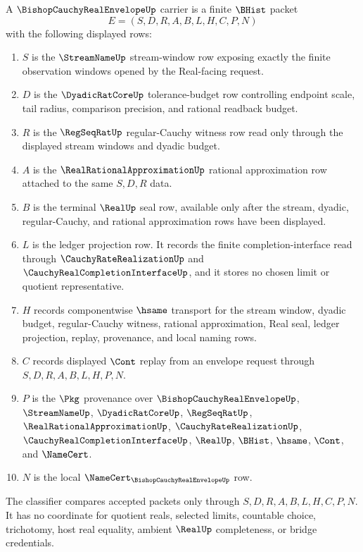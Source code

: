 \begin{definition}
\label{def:bishop-cauchy-real-envelope-carrier}
A $\BishopCauchyRealEnvelopeUp$ carrier is a finite $\BHist$ packet
$$
E=(S,D,R,A,B,L,H,C,P,N)
$$
with the following displayed rows:
\begin{enumerate}
\item $S$ is the $\StreamNameUp$ stream-window row exposing exactly the finite observation windows opened by the Real-facing request.
\item $D$ is the $\DyadicRatCoreUp$ tolerance-budget row controlling endpoint scale, tail radius, comparison precision, and rational readback budget.
\item $R$ is the $\RegSeqRatUp$ regular-Cauchy witness row read only through the displayed stream windows and dyadic budget.
\item $A$ is the $\RealRationalApproximationUp$ rational approximation row attached to the same $S,D,R$ data.
\item $B$ is the terminal $\RealUp$ seal row, available only after the stream, dyadic, regular-Cauchy, and rational approximation rows have been displayed.
\item $L$ is the ledger projection row. It records the finite completion-interface read through $\CauchyRateRealizationUp$ and $\CauchyRealCompletionInterfaceUp$, and it stores no chosen limit or quotient representative.
\item $H$ records componentwise $\hsame$ transport for the stream window, dyadic budget, regular-Cauchy witness, rational approximation, Real seal, ledger projection, replay, provenance, and local naming rows.
\item $C$ records displayed $\Cont$ replay from an envelope request through $S,D,R,A,B,L,H,P,N$.
\item $P$ is the $\Pkg$ provenance over $\BishopCauchyRealEnvelopeUp$, $\StreamNameUp$, $\DyadicRatCoreUp$, $\RegSeqRatUp$, $\RealRationalApproximationUp$, $\CauchyRateRealizationUp$, $\CauchyRealCompletionInterfaceUp$, $\RealUp$, $\BHist$, $\hsame$, $\Cont$, and $\NameCert$.
\item $N$ is the local $\NameCert_{\BishopCauchyRealEnvelopeUp}$ row.
\end{enumerate}
The classifier compares accepted packets only through $S,D,R,A,B,L,H,C,P,N$. It has no coordinate for quotient reals, selected limits, countable choice, trichotomy, host real equality, ambient $\RealUp$ completeness, or bridge credentials.
\end{definition}

